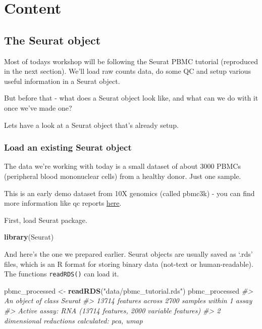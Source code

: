 \documentclass[
]{book}
\newenvironment{Shaded}{\begin{snugshade}}{\end{snugshade}}
\newcommand{\CommentTok}[1]{\textcolor[rgb]{0.56,0.35,0.01}{\textit{#1}}}
\newcommand{\FunctionTok}[1]{\textcolor[rgb]{0.13,0.29,0.53}{\textbf{#1}}}
\newcommand{\NormalTok}[1]{#1}
\newcommand{\OtherTok}[1]{\textcolor[rgb]{0.56,0.35,0.01}{#1}}
\newcommand{\StringTok}[1]{\textcolor[rgb]{0.31,0.60,0.02}{#1}}
\begin{document}
\hypertarget{part-content}{%
\part{Content}\label{part-content}}

\hypertarget{seuratobject}{%
\chapter{The Seurat object}\label{seuratobject}}

Most of todays workshop will be following the Seurat PBMC tutorial (reproduced in the next section).
We'll load raw counts data, do some QC and setup various useful information in a Seurat object.

But before that - what does a Seurat object look like, and what can we do with it once we've made one?

Lets have a look at a Seurat object that's already setup.

\hypertarget{load-an-existing-seurat-object}{%
\section{Load an existing Seurat object}\label{load-an-existing-seurat-object}}

The data we're working with today is a small dataset of about 3000 PBMCs (peripheral blood mononuclear cells) from a healthy donor. Just one sample.

This is an early demo dataset from 10X genomics (called pbmc3k) - you can find more information like qc reports \href{https://www.10xgenomics.com/resources/datasets/3-k-pbm-cs-from-a-healthy-donor-1-standard-1-1-0}{here}.

First, load Seurat package.

\begin{Shaded}
\begin{Highlighting}[]
\FunctionTok{library}\NormalTok{(Seurat)}
\end{Highlighting}
\end{Shaded}

And here's the one we prepared earlier. Seurat objects are usually saved as `.rds' files, which is an R format for storing binary data (not-text or human-readable). The functions \texttt{readRDS()} can load it.

\begin{Shaded}
\begin{Highlighting}[]
\NormalTok{pbmc\_processed }\OtherTok{\textless{}{-}} \FunctionTok{readRDS}\NormalTok{(}\StringTok{"data/pbmc\_tutorial.rds"}\NormalTok{)}
\NormalTok{pbmc\_processed}
\CommentTok{\#\textgreater{} An object of class Seurat }
\CommentTok{\#\textgreater{} 13714 features across 2700 samples within 1 assay }
\CommentTok{\#\textgreater{} Active assay: RNA (13714 features, 2000 variable features)}
\CommentTok{\#\textgreater{}  2 dimensional reductions calculated: pca, umap}
\end{Highlighting}
\end{Shaded}
\end{document}
